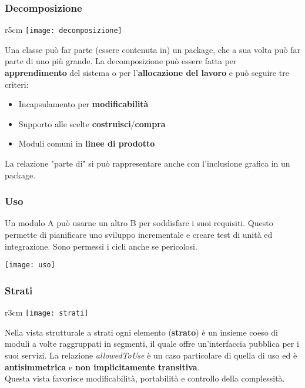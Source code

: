 \subsubsection{Decomposizione}
\begin{wrapfigure}[7]{r}{5cm}
	\vspace{-1.2cm}
	\texttt{[image: decomposizione]}
\end{wrapfigure}
Una classe può far parte (essere contenuta in) un package, che a sua volta può far parte di uno più grande. La decomposizione può essere fatta per \textbf{apprendimento} del sistema o per l'\textbf{allocazione del lavoro} e può seguire tre criteri:
\begin{itemize}
	\item Incapsulamento per \textbf{modificabilità}
	\item Supporto alle scelte \textbf{costruisci}/\textbf{compra}
	\item Moduli comuni in \textbf{linee di prodotto}
\end{itemize}

\begin{note}
	La relazione "parte di" si può rappresentare anche con l'inclusione grafica in un package.
\end{note}

\newpage

\subsubsection{Uso}
Un modulo A può usarne un altro B per soddisfare i suoi requisiti. Questo permette di pianificare uno sviluppo incrementale e creare test di unità ed integrazione. Sono permessi i cicli anche se pericolosi.

\begin{center}
	\texttt{[image: uso]}
\end{center}

\subsubsection{Strati}
\begin{wrapfigure}[10]{r}{3cm}
	\vspace{-1cm}
	\texttt{[image: strati]}
\end{wrapfigure}
Nella vista strutturale a strati ogni elemento (\textbf{strato}) è un insieme coeso di moduli a volte raggruppati in segmenti, il quale offre un'interfaccia pubblica per i suoi servizi. La relazione \textit{allowedToUse} è un caso particolare di quella di uso ed è \textbf{antisimmetrica} e \textbf{non implicitamente transitiva}.\\
Questa vista favorisce modificabilità, portabilità e controllo della complessità.

